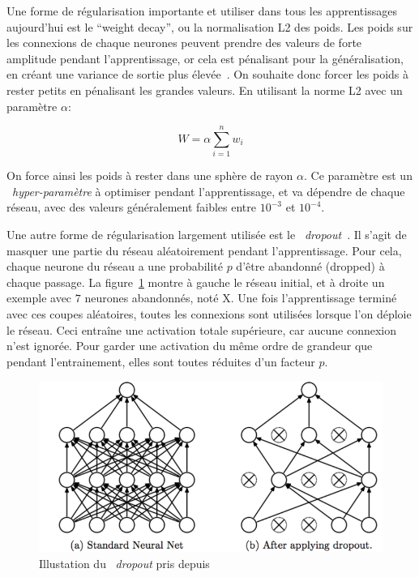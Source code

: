 Une forme de régularisation importante et utiliser dans tous les apprentissages aujourd'hui est le ``weight decay'', ou la normalisation L2 des poids.
Les poids sur les connexions de chaque neurones peuvent prendre des valeurs de forte amplitude pendant l'apprentissage, or cela est pénalisant pour la généralisation, en créant une variance de sortie plus élevée~\cite{hanson1989comparing, krogh1992simple}.
On souhaite donc forcer les poids à rester petits en pénalisant les grandes valeurs.
En utilisant la norme L2 avec un paramètre $\alpha$:

\begin{equation}
	W = \alpha \sum_{i=1}^n w_i
\label{eq:weightDecay}
\end{equation}

On force ainsi les poids à rester dans une sphère de rayon $\alpha$.
Ce paramètre est un ~\textit{hyper-paramètre} à optimiser pendant l'apprentissage, et va dépendre de chaque réseau, avec des valeurs généralement faibles entre $10^{-3}$ et $10^{-4}$.


Une autre forme de régularisation largement utilisée est le ~\textit{dropout}~\cite{srivastava2014dropout}.
Il s'agit de masquer une partie du réseau aléatoirement pendant l'apprentissage.
Pour cela, chaque neurone du réseau a une probabilité $p$ d'être abandonné (dropped) à chaque passage.
La figure~\ref{fig:dropout} montre à gauche le réseau initial, et à droite un exemple avec $7$ neurones abandonnés, noté X.
Une fois l'apprentissage terminé avec ces coupes aléatoires, toutes les connexions sont utilisées lorsque l'on déploie le réseau.
Ceci entraîne une activation totale supérieure, car aucune connexion n'est ignorée. 
Pour garder une activation du même ordre de grandeur que pendant l'entrainement, elles sont toutes réduites d'un facteur $p$.

\begin{figure}%
\includegraphics[width=\columnwidth]{figures/dropout.png}%
\caption{Illustation du ~\textit{dropout} pris depuis ~\cite{srivastava2014dropout}}%
\label{fig:dropout}%
\end{figure}


